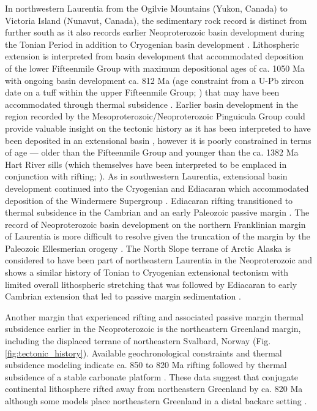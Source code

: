 \documentclass[twocolumn, switch]{article} %
\begin{document}
In northwestern Laurentia from the Ogilvie Mountains (Yukon, Canada) to Victoria Island (Nunavut, Canada), the sedimentary rock record is distinct from further south as it also records earlier Neoproterozoic basin development during the Tonian Period in addition to Cryogenian basin development \citep{Macdonald2012a}. Lithospheric extension is interpreted from basin development that accommodated deposition of the lower Fifteenmile Group with maximum depositional ages of ca. 1050 Ma with ongoing basin development ca. 812 Ma (age constraint from a U-Pb zircon date on a tuff within the upper Fifteenmile Group; \citealp{Macdonald2010a}) that may have been accommodated through thermal subsidence \citep{Macdonald2012a}. Earlier basin development in the region recorded by the Mesoproterozoic/Neoproterozoic Pinguicula Group could provide valuable insight on the tectonic history as it has been interpreted to have been deposited in an extensional basin \citep{Medig2016a}, however it is poorly constrained in terms of age --- older than the Fifteenmile Group and younger than the ca. 1382 Ma Hart River sills (which themselves have been interpreted to be emplaced in conjunction with rifting; \citealp{Verbaas2018a}). As in southwestern Laurentia, extensional basin development continued into the Cryogenian and Ediacaran which accommodated deposition of the Windermere Supergroup \citep{Moynihan2019a}. Ediacaran rifting transitioned to thermal subsidence in the Cambrian and an early Paleozoic passive margin \citep{Moynihan2019a}. The record of Neoproterozoic basin development on the northern Franklinian margin of Laurentia is more difficult to resolve given the truncation of the margin by the Paleozoic Ellesmerian orogeny \citep{Cocks2011a}. The North Slope terrane of Arctic Alaska is considered to have been part of northeastern Laurentia in the Neoproterozoic and shows a similar history of Tonian to Cryogenian extensional tectonism with limited overall lithospheric stretching that was followed by Ediacaran to early Cambrian extension that led to passive margin sedimentation \citep{Strauss2019a}. 

Another margin that experienced rifting and associated passive margin thermal subsidence earlier in the Neoproterozoic is the northeastern Greenland margin, including the displaced terrane of northeastern Svalbard, Norway (Fig. \ref{fig:tectonic_history}). Available geochronological constraints and thermal subsidence modeling indicate ca. 850 to 820 Ma rifting followed by thermal subsidence of a stable carbonate platform \citep{Maloof2006a, Sonderholm2008a, Halverson2018a}. These data suggest that conjugate continental lithosphere rifted away from northeastern Greenland by ca. 820 Ma although some models place northeastern Greenland in a distal backarc setting \citep{Malone2014a}.
\end{document}
